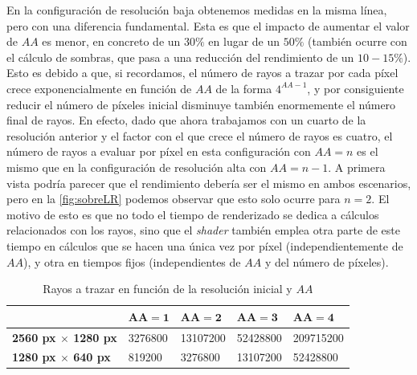 En la configuración de resolución baja obtenemos medidas en la misma línea, pero con una diferencia fundamental. Esta es que el impacto de aumentar el valor de $AA$ es menor, en concreto de un $30\%$ en lugar de un $50\%$ (también ocurre con el cálculo de sombras, que pasa a una reducción del rendimiento de un $10-15\%$). Esto es debido a que, si recordamos, el número de rayos a trazar por cada píxel crece exponencialmente en función de $AA$ de la forma $4^{AA-1}$, y por consiguiente reducir el número de píxeles inicial disminuye también enormemente el número final de rayos. En efecto, dado que ahora trabajamos con un cuarto de la resolución anterior y el factor con el que crece el número de rayos es cuatro, el número de rayos a evaluar por píxel en esta configuración con $AA=n$ es el mismo que en la configuración de resolución alta con $AA=n-1$. A primera vista podría parecer que el rendimiento debería ser el mismo en ambos escenarios, pero en la \autoref{fig:sobreLR} podemos observar que esto solo ocurre para $n=2$. El motivo de esto es que no todo el tiempo de renderizado se dedica a cálculos relacionados con los rayos, sino que el \textit{shader} también emplea otra parte de este tiempo en cálculos que se hacen una única vez por píxel (independientemente de $AA$), y otra en tiempos fijos (independientes de $AA$ y del número de píxeles).
\begin{table}[!ht]
    \centering
    \begin{tabular}{|l|l|l|l|l|}
        \hline
        & $\boldsymbol{AA=1}$ & $\boldsymbol{AA=2}$ & $\boldsymbol{AA=3}$ & $\boldsymbol{AA=4}$ \\ \hline
        \textbf{2560 px $\times$ 1280 px} & 3276800 & 13107200 & 52428800 & 209715200 \\ \hline
        \textbf{1280 px $\times$ 640 px} & 819200 & 3276800 & 13107200 & 52428800 \\ \hline
    \end{tabular}
    \caption{Rayos a trazar en función de la resolución inicial y $AA$}
\end{table}

